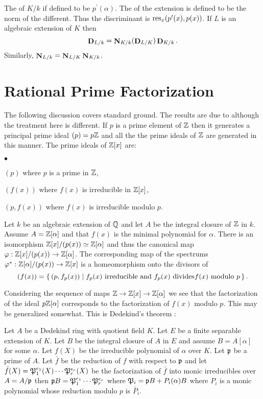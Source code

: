 The  of $K/k$ if defined to be $p^{\prime}(\alpha)$.  The
 of the extension is defined to be the norm of the
different.  Thus the discriminant is $\mathop{\rm res}\nolimits_x(p'(x), p(x))$.  If $L$ is an
algebraic extension of $K$ then 
\[
\mathop{\mathbf{D}}\nolimits_{L/k} = \mathop{\mathbf{N}}\nolimits_{K/k}(\mathop{\mathbf{D}}\nolimits_{L/K}) \mathop{\mathbf{D}}\nolimits_{K/k}.
\]
Similarly, $\mathop{\mathbf{N}}\nolimits_{L/k} = \mathop{\mathbf{N}}\nolimits_{L/K} \mathop{\mathbf{N}}\nolimits_{K/k}$.


\section{Rational Prime Factorization}

The following discussion covers standard ground.  The results are due to
{\Dedekind} \cite{Lang:ANT,Dedekind:Primes} although the treatment here is
different.  If $p$ is a prime element of $\mathbb{Z}$ then it generates a principal
prime ideal $(p) = p \mathbb{Z}$ and all the the prime ideals of $\mathbb{Z}$ are generated
in this manner.  The prime ideals of $\mathbb{Z}[x]$ are:
\begin{list}{$\bullet$}{\parsep=0pt}
\item $(p)$ where $p$ is a prime in $\mathbb{Z}$,
\item $(f(x))$ where $f(x)$ is irreducible in $\mathbb{Z}[x]$, 
\item  $(p, f(x))$ where $f(x)$ is irreducible modulo $p$.
\end{list}
Let $k$ be an algebraic extension of $\mathbb{Q}$ and let $A$ be the integral
closure of $\mathbb{Z}$ in $k$.  Assume $A = \mathbb{Z}[\alpha]$ and that $f(x)$ is the
minimal polynomial for $\alpha$.  There is an isomorphism $\mathbb{Z}[x]/(p(x))
\simeq \mathbb{Z}[\alpha]$ and thus the canonical map $\varphi:\mathbb{Z}[x]/(p(x))
\rightarrow \mathbb{Z}[\alpha]$.  The corresponding map of the spectrums
$\varphi^{\ast}:\mathbb{Z}[\alpha]/(p(x)) \rightarrow \mathbb{Z}[x]$ is a homeomorphism
onto the divisors of
\[
(f(x)) = \left\{\,(p, f_p(x)) \mid
\hbox{$f_p(x)$ irreducible and  $f_{p}(x)$ divides$f(x)$ modulo $p$}\,\right\}.
\]

Considering the sequence of maps $\mathbb{Z} \rightarrow \mathbb{Z}[x] \rightarrow
\mathbb{Z}[\alpha]$ we see that the factorization of the ideal $p \mathbb{Z}[\alpha]$
corresponds to the factorization of $f(x)$ modulo $p$.   This may be
generalized somewhat.  This is Dedekind's theorem \cite{Lang:ANT}:

\begin{proposition}
Let $A$ be a Dedekind ring with quotient field $K$.  Let $E$ be a
finite separable extension of $K$.  Let $B$ be the integral closure of
$A$ in $E$ and assume $B = A[\alpha]$ for some $\alpha$.  Let $f(X)$
be the irreducible polynomial of $\alpha$ over $K$.  Let ${\mathfrak p}$ be a
prime of $A$.  Let $\bar f$ be the reduction of $f$ with respect to
${\mathfrak p}$ and let $\bar f(X) = {\mathfrak P}_1^{e_1}(X) \cdots
{\mathfrak P}_r^{e_r}(X)$ be the factorization of $\bar f$ into monic
irreducibles over $A = A/{\mathfrak p}$ then ${\mathfrak p} B = {\mathfrak P}_1^{e_1} \cdots
{\mathfrak P}_r^{e_r}$ where ${\mathfrak P}_i = {\mathfrak p} B + P_i(\alpha) B$ where $P_i$
is a monic polynomial whose reduction modulo $p$ is $\bar P_i$.
\end{proposition}

